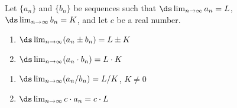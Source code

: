 {Let $\{a_n\}$ and $\{b_n\}$ be sequences such that $\ds \lim_{n\to\infty} a_n = L$, $\ds \lim_{n\to\infty} b_n = K$, and let $c$ be a real number.

\begin{minipage}[t]{.5\linewidth}
\begin{enumerate}
\item		$\ds \lim_{n\to\infty} (a_n\pm b_n) = L\pm K$
\item		$\ds \lim_{n\to\infty} (a_n\cdot b_n) = L\cdot K$
\end{enumerate}
\end{minipage}
\begin{minipage}[t]{.5\linewidth}
\begin{enumerate}\addtocounter{enumi}{2}
\item		$\ds \lim_{n\to\infty} (a_n/b_n) = L/K$, $K\neq 0$
\item		$\ds \lim_{n\to\infty} c\cdot a_n = c\cdot L$
\end{enumerate}
\end{minipage}
}

